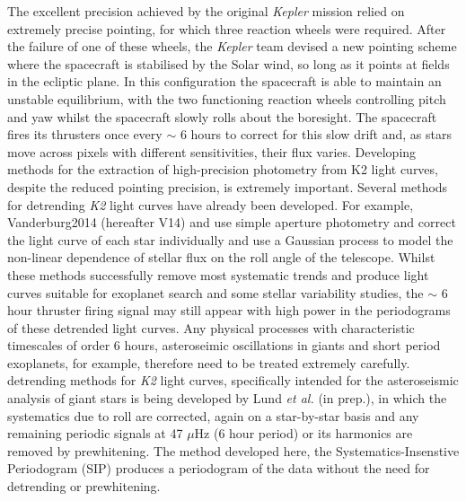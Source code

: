 \documentclass[useAMS, usenatbib, preprint, 12pt]{aastex}
\begin{document}
The excellent precision achieved by the original {\it Kepler} mission relied
on extremely precise pointing, for which three reaction wheels were required.
After the failure of one of these wheels, the {\it Kepler} team devised a new
pointing scheme where the spacecraft is stabilised by the Solar wind, so long
as it points at fields in the ecliptic plane.
In this configuration the spacecraft is able to maintain an unstable
equilibrium, with the two functioning reaction wheels controlling pitch and
yaw whilst the spacecraft slowly rolls about the boresight.
The spacecraft fires its thrusters once every $\sim$ 6 hours to correct for
this slow drift and, as stars move across pixels with different sensitivities,
their flux varies.
Developing methods for the extraction of high-precision photometry from K2
light curves, despite the reduced pointing precision, is extremely
important.
Several methods for detrending {\it K2} light curves have already been
developed.
For example, {Vanderburg2014} (hereafter V14) and \citet{Crossfield2015}
use simple aperture photometry and correct the light curve of each star
individually and \citet{Aigrain2015} use a Gaussian process to model the
non-linear dependence of stellar flux on the roll angle of the telescope.
Whilst these methods successfully remove most systematic trends and
produce light curves suitable for exoplanet search and some stellar
variability studies, the $\sim$ 6 hour thruster firing signal may still appear
with high power in the periodograms of these detrended light curves.
Any physical processes with characteristic timescales of order
6 hours, asteroseimic oscillations in giants and short period
exoplanets, for example, therefore need to be treated extremely carefully.
 detrending methods for {\it K2} light curves, specifically intended for the
asteroseismic analysis of giant stars is being developed by Lund {\it et al.}
(in prep.), in which the systematics due to roll are corrected, again on
a star-by-star basis and any remaining periodic signals at 47 $\mu$Hz (6 hour
period) or its harmonics are removed by prewhitening.
The method developed here, the Systematics-Insenstive Periodogram (SIP)
produces a periodogram of the data without the need for detrending or
prewhitening.
\end{document}
